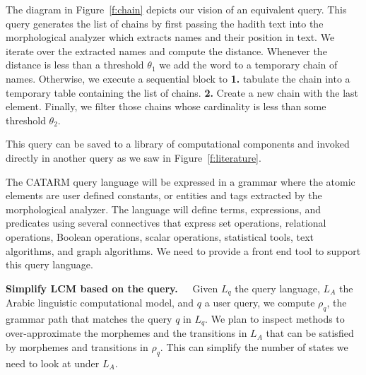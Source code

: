 \documentclass[12pt]{article}
\begin{document}
The diagram in Figure~\ref{f:chain} depicts our vision of 
an equivalent query.
This query generates the list of chains by first passing the 
hadith text into the morphological analyzer which 
extracts names and their position in text. 
We iterate over the extracted names and compute the distance.
Whenever the distance is less than a threshold $\theta_1$
we add the word to a temporary chain of names. 
Otherwise, we execute a sequential block to 
{\bf 1.} tabulate the chain into a temporary table containing 
the list of chains. 
{\bf 2.} Create a new chain with the last element.
Finally, we filter those chains whose cardinality 
is less than some threshold  $\theta_2$.

This query can be saved to a library of computational components
and invoked directly in another query 
as we saw in Figure~\ref{f:literature}.

\begin{figure}
\end{figure}

The CATARM query language will be expressed in a grammar 
where the atomic elements are user defined constants, or
entities and tags extracted by the morphological analyzer. 
The language will define terms, expressions, and predicates
using several connectives that express set operations, 
relational operations, Boolean operations, scalar operations, 
statistical tools, text algorithms, and graph algorithms. 
We need to provide a front end tool to support this query
language.

{\bf Simplify LCM based on the query.~~}
Given $L_q$ the query language, 
$L_A$ the Arabic linguistic
computational model, and  $q$ a user query,
we compute $\rho_q$, the grammar path that matches 
the query $q$ in $L_q$. 
We plan to inspect methods to over-approximate 
the morphemes and the transitions in $L_A$ 
that can be satisfied by morphemes and transitions
in $\rho_q$. 
This can simplify the number of states we need to 
look at under $L_A$. 
\end{document}
